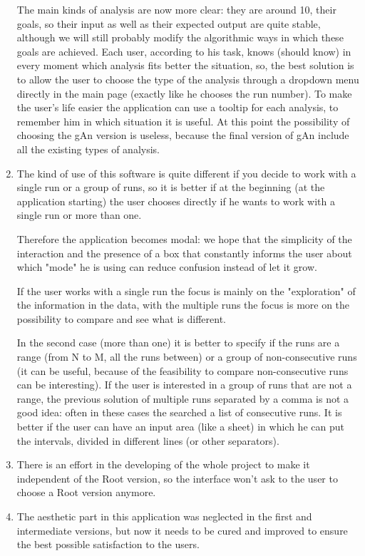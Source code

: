 \begin{enumerate}
The main kinds of analysis are now more clear: they are around 10, their goals, so their input as well as their expected output are quite stable, although we will still probably modify the algorithmic ways in which these goals are achieved. Each user, according to his task, knows (should know) in every moment which analysis fits better the situation, so, the best solution is to allow the user to choose the type of the analysis through a dropdown menu directly in the main page (exactly like he chooses the run number). To make the user's life easier the application can use a tooltip for each analysis, to remember him in which situation it is useful. At this point the possibility of choosing the gAn version is useless, because the final version of gAn include all the existing types of analysis. 

\item 
The kind of use of this software is quite different if you decide to work with a single run or a group of runs, so it is better if at the beginning (at the application starting) the user chooses directly if he wants to work with a single run or more than one. 

Therefore the application becomes modal: we hope that the simplicity of the interaction and the presence of a box that constantly informs the user about which "mode" he is using can reduce confusion instead of let it grow.  

If the user works with a single run the focus is mainly on the "exploration" of the information in the data, with the multiple runs the focus is more on the possibility to compare and see what is different.

In the second case (more than one) it is better to specify if the runs are a range (from N to M, all the runs between) or a group of non-consecutive runs (it can be useful, because of the feasibility to compare non-consecutive runs can be interesting). If the user is interested in a group of runs that are not a range, the previous solution of multiple runs separated by a comma is not a good idea: often in these cases the searched a list of consecutive runs. It is better if the user can have an input area (like a sheet) in which he can put the intervals, divided in different lines (or other separators).

\item
There is an effort in the developing of the whole project to make it independent of the Root version, so the interface won't ask to the user to choose a Root version anymore. 

\item
The aesthetic part in this application was neglected in the first and intermediate versions, but now it needs to be cured and improved to ensure the best possible satisfaction to the users. 

\end{enumerate}
 
